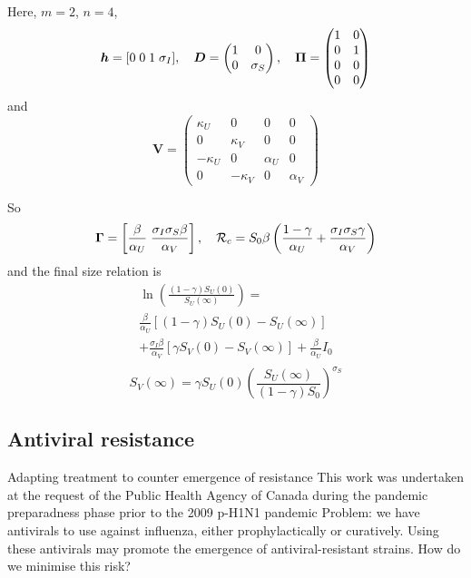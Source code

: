 \documentclass[aspectratio=169]{beamer}\usepackage[]{graphicx}\usepackage[]{xcolor}
\begin{document}
\begin{frame}
Here, $m=2$, $n=4$,
\[
\bm{h} = [0\;0\;1\;\sigma_I],\quad
\bm{D}=\begin{pmatrix}
1 & 0 \\ 0 & \sigma_S
\end{pmatrix},\quad
\bm{\Pi}=
\begin{pmatrix}
1 & 0 \\ 0 & 1 \\ 0 & 0 \\ 0 & 0
\end{pmatrix}
\]
and
\[
\mathbf{V}=
\begin{pmatrix}
\kappa_U & 0 & 0 & 0 \\
0 & \kappa_V & 0 & 0 \\
-\kappa_U & 0 & \alpha_U & 0 \\
0 & -\kappa_V & 0 & \alpha_V
\end{pmatrix}
\]
\end{frame}

\begin{frame}
So
\[
\bm{\Gamma}=\left[
\frac{\beta}{\alpha_U}\; \frac{\sigma_I\sigma_S\beta}{\alpha_V}
\right],
\quad
\mathcal{R}_c = S_0\beta\left(
\frac{1-\gamma}{\alpha_U}+\frac{\sigma_I\sigma_S\gamma}{\alpha_V}
\right)
\]
and the final size relation is
\begin{multline*}
\ln\left(
\frac{(1-\gamma)S_U(0)}{S_U(\infty)}
\right)
= \\ 
\frac{\beta}{\alpha_U}[(1-\gamma)S_U(0)-S_U(\infty)] \\
+\frac{\sigma_I\beta}{\alpha_V}[\gamma S_V(0)-S_V(\infty)]+\frac{\beta}{\alpha_U}I_0 \\
\end{multline*}
\[
S_V(\infty) = \gamma S_U(0)\left(
\frac{S_U(\infty)}{(1-\gamma)S_0}
\right)^{\sigma_S}
\]
\end{frame}

\subsection{Antiviral resistance}


\begin{frame}{Adapting treatment to counter emergence of resistance}
This work was undertaken at the request of the Public Health Agency of Canada during the pandemic preparadness phase prior to the 2009 p-H1N1 pandemic
\vfill
Problem: we have antivirals to use against influenza, either prophylactically or curatively. Using these antivirals may promote the emergence of antiviral-resistant strains. How do we minimise this risk?
\end{frame}
\end{document}
